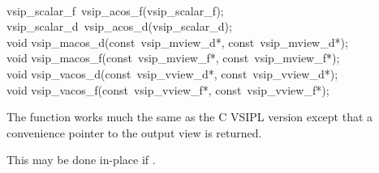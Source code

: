 \\\cvsiplh
\begin{cfuncs}
vsip\_scalar\_f~vsip\_acos\_f(vsip\_scalar\_f);\\
vsip\_scalar\_d~vsip\_acos\_d(vsip\_scalar\_d);\\
void vsip\_macos\_d(const~vsip\_mview\_d*, const~vsip\_mview\_d*);\\
void vsip\_macos\_f(const~vsip\_mview\_f*, const~vsip\_mview\_f*);\\
void vsip\_vacos\_d(const~vsip\_vview\_d*, const~vsip\_vview\_d*);\\
void vsip\_vacos\_f(const~vsip\_vview\_f*, const~vsip\_vview\_f*);\\
\end{cfuncs}
\pyjvsiph
{}
\begin{comments}
\item{The  function works much the same as the C VSIPL version except that a convenience pointer to the output view is returned.}
\item{This may be done in-place if .}
\end{comments}
